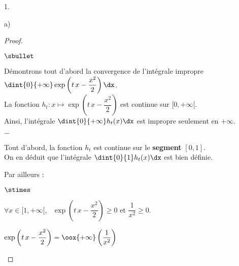 \documentclass[11pt]{article}%
\begin{document}
\begin{noliste}{1.}
\begin{noliste}{a)}
\begin{proof}
\begin{noliste}{$\sbullet$}
      \item Démontrons tout d'abord la convergence de l'intégrale
        impropre $\dint{0}{+\infty} \exp\left(t \, x -
          \dfrac{x^2}{2}\right) \dx$.\\
        La fonction $h_t : x \mapsto \exp\left(t \, x -
          \dfrac{x^2}{2}\right)$ est continue sur $[0, +\infty[$.\\
        Ainsi, l'intégrale $\dint{0}{+\infty} h_t(x) \dx$ est impropre
        seulement en $+\infty$.
      \end{noliste}
      \begin{liste}{$-$}
      \item Tout d'abord, la fonction $h_t$ est continue sur le {\bf
          segment} $[0,1]$.\\
        On en déduit que l'intégrale $\dint{0}{1} h_t(x) \dx$ est bien
        définie.
        
      \item Par ailleurs :
        \begin{noliste}{$\stimes$}
        \item $\forall x \in [1, +\infty[$, \ $\exp\left(t \, x -
            \dfrac{x^2}{2}\right) \geq 0$ \quad et \quad
          $\dfrac{1}{x^2} \geq 0$.
          
        \item $\exp\left(t \, x - \dfrac{x^2}{2}\right) =
          \oox{+\infty} \left( \dfrac{1}{x^2} \right)$          
          

\end{noliste}
\end{liste}
\end{proof}
\end{noliste}
\end{noliste}
\end{document}
